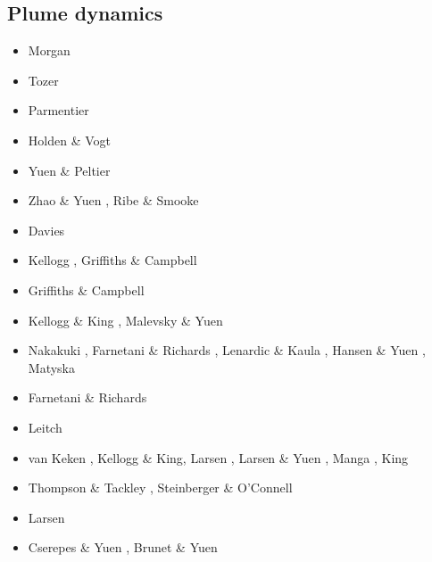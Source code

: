 \subsection{Plume dynamics}

\begin{scriptsize}
\begin{itemize}
\item[\nineteenseventyone] Morgan \cite{morg71}
\item[\nineteenseventythree] Tozer \cite{toze73}
\item[\nineteenseventyfive] Parmentier \etal \cite{patt75}
\item[\nineteenseventyseven] Holden \& Vogt \cite{hovo77}
\item[\nineteeneighty] Yuen \& Peltier \cite{yupe80}
\item[\nineteeneightyseven] Zhao \& Yuen \cite{zhyu87}, Ribe \& Smooke \cite{rism87}
\item[\nineteenninety] Davies \cite{davi90}
\item[\nineteenninetyone] Kellogg \cite{kell91}, Griffiths \& Campbell \cite{grca91b}
\item[\nineteenninety] Griffiths \& Campbell \cite{grca90}
\item[\nineteenninetythree] Kellogg \& King \cite{keki93}, Malevsky \& Yuen \cite{mayu93}
\item[\nineteenninetyfour] Nakakuki \etal \cite{nasf94}, Farnetani \& Richards \cite{fari94},
                           Lenardic \& Kaula \cite{leka94b}, Hansen \& Yuen \cite{hayu94},
                           Matyska \etal \cite{mamy94}
\item[\nineteenninetyfive] Farnetani \& Richards \cite{fari95}
\item[\nineteenninetysix] Leitch \etal \cite{lesy96} 
\item[\nineteenninetyseven] van Keken \cite{vank97}, Kellogg \& King\cite{keki97},
                            Larsen \etal \cite{laym97}, Larsen \& Yuen \cite{layu97,layu97b},
                            Manga \cite{mang97}, King \cite{king97} 
\item[\nineteenninetyeight] Thompson \& Tackley \cite{thta98}, Steinberger \& O'Connell \cite{stoc98}
\item[\nineteenninetynine] Larsen \etal \cite{lays99}
\item[\twothousand] Cserepes \& Yuen \cite{csyu00}, Brunet \& Yuen \cite{bryu00}

\end{itemize}
\end{scriptsize}
